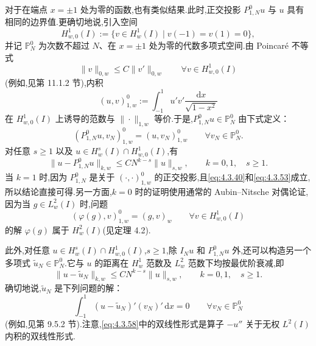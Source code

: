 对于在端点 \(x=\pm1\) 处为零的函数,也有类似结果.此时,正交投影 \(P_{1,N}^0u\) 与 \(u\) 具有相同的边界值.更确切地说,引入空间
\begin{equation}\label{eq:4.3.52}
  H^1_{w,0}(I):=\{v\in H^1_w(I)\mid v(-1)=v(1)=0\},
\end{equation}
并记 \(\mathbb P_N^0\) 为次数不超过 \(N\)、在 \(x=\pm1\) 处为零的代数多项式空间.由 Poincaré 不等式
\begin{equation}\label{eq:4.3.53}
  \|v\|_{0,w}\le C\|v'\|_{0,w}\qquad\forall v\in H^1_{w,0}(I)
\end{equation}
(例如,见第 11.1.2 节),内积
\begin{equation}\label{eq:4.3.54}
  (u,v)^0_{1,w}:=\int_{-1}^1u'v'\frac{\mathrm dx}{\sqrt{1-x^2}}
\end{equation}
在 \(H^1_{w,0}(I)\) 上诱导的范数与 \(\|\cdot\|_{1,w}\) 等价.于是,\(P_{1,N}^0u\in\mathbb P_N^0\) 由下式定义：
\begin{equation}\label{eq:4.3.55}
  (P_{1,N}^0u,v_N)^0_{1,w}=(u,v_N)^0_{1,w}\qquad\forall v_N\in\mathbb P_N^0.
\end{equation}
对任意 \(s\ge1\) 以及 \(u\in H_w^s(I)\cap H^1_{w,0}(I)\),有
\begin{equation}\label{eq:4.3.56}
  \|u-P_{1,N}^0u\|_{k,w}\le CN^{k-s}\|u\|_{s,w},
  \qquad k=0,1,\quad s\ge1.
\end{equation}
当 \(k=1\) 时,因为 \(P_{1,N}^0\) 是关于 \((\cdot,\cdot)^0_{1,w}\) 的正交投影,且\eqref{eq:4.3.40}和\eqref{eq:4.3.53}成立,所以结论直接可得.另一方面,\(k=0\) 时的证明使用通常的 Aubin--Nitsche 对偶论证,因为当 \(g\in L_w^2(I)\) 时,问题
\[
  (\varphi(g),v)^0_{1,w}=(g,v)_w
  \qquad\forall v\in H^1_{w,0}(I)
\]
的解 \(\varphi(g)\) 属于 \(H_w^2(I)\)(见定理 4.2).

此外,对任意 \(u\in H_w^s(I)\cap H^1_{w,0}(I)\),\(s\ge1\),除 \(I_Nu\) 和 \(P_{1,N}^0u\) 外,还可以构造另一个多项式 \(\widetilde u_N\in\mathbb P_N^0\).它与 \(u\) 的距离在 \(H_w^1\) 范数及 \(L_w^2\) 范数下均按最优阶衰减,即
\begin{equation}\label{eq:4.3.57}
  \|u-\widetilde u_N\|_{k,w}\le CN^{k-s}\|u\|_{s,w},
  \qquad k=0,1,\quad s\ge1.
\end{equation}
确切地说,\(\widetilde u_N\) 是下列问题的解：
\begin{equation}\label{eq:4.3.58}
  \int_{-1}^1(u-\widetilde u_N)'(v_N)'\,\mathrm dx=0
  \qquad\forall v_N\in\mathbb P_N^0
\end{equation}
(例如,见第 9.5.2 节).注意,\eqref{eq:4.3.58}中的双线性形式是算子 \(-u''\) 关于无权 \(L^2(I)\) 内积的双线性形式.

